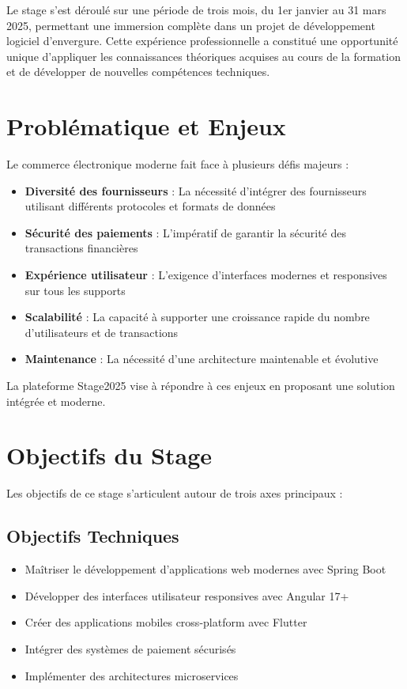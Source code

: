 \documentclass[12pt,a4paper]{report}
\begin{document}
Le stage s'est déroulé sur une période de trois mois, du 1er janvier au 31 mars 2025, permettant une immersion complète dans un projet de développement logiciel d'envergure. Cette expérience professionnelle a constitué une opportunité unique d'appliquer les connaissances théoriques acquises au cours de la formation et de développer de nouvelles compétences techniques.

\section{Problématique et Enjeux}

Le commerce électronique moderne fait face à plusieurs défis majeurs :

\begin{itemize}
    \item \textbf{Diversité des fournisseurs} : La nécessité d'intégrer des fournisseurs utilisant différents protocoles et formats de données
    \item \textbf{Sécurité des paiements} : L'impératif de garantir la sécurité des transactions financières
    \item \textbf{Expérience utilisateur} : L'exigence d'interfaces modernes et responsives sur tous les supports
    \item \textbf{Scalabilité} : La capacité à supporter une croissance rapide du nombre d'utilisateurs et de transactions
    \item \textbf{Maintenance} : La nécessité d'une architecture maintenable et évolutive
\end{itemize}

La plateforme Stage2025 vise à répondre à ces enjeux en proposant une solution intégrée et moderne.

\section{Objectifs du Stage}

Les objectifs de ce stage s'articulent autour de trois axes principaux :

\subsection{Objectifs Techniques}

\begin{itemize}
    \item Maîtriser le développement d'applications web modernes avec Spring Boot
    \item Développer des interfaces utilisateur responsives avec Angular 17+
    \item Créer des applications mobiles cross-platform avec Flutter
    \item Intégrer des systèmes de paiement sécurisés
    \item Implémenter des architectures microservices
\end{itemize}
\end{document}

